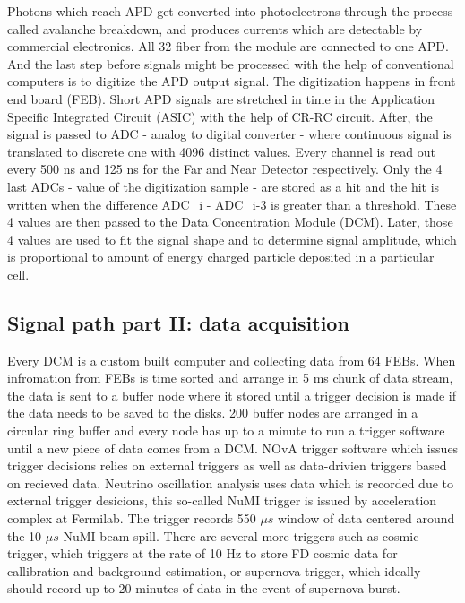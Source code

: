 Photons which reach APD get converted into photoelectrons through the process called avalanche 
breakdown, and produces currents which are detectable by commercial electronics. All 32 fiber from
the module are connected to one APD. And the last step before signals might be processed with the 
help of conventional computers is to digitize the APD output signal. The digitization happens in
front end board (FEB). Short APD signals are stretched in time in the Application Specific 
Integrated Circuit (ASIC) with the help of CR-RC circuit. After, the signal is passed to ADC - 
analog to digital converter - where continuous signal is translated to discrete one with 4096 
distinct values. Every channel is read out every 500 ns and 125 ns for the Far and Near Detector 
respectively. Only the 4 last ADCs - value of the digitization sample - are stored as a hit and 
the hit is written when the difference
\be
ADC_i - ADC_{i-3}
\ee
is greater than a threshold. These 4 values are then passed to the Data Concentration Module (DCM). 
Later, those 4 values are used to fit the signal shape and to determine signal amplitude, which 
is proportional to amount of energy charged particle deposited in a particular cell.

\subsection{Signal path part II: data acquisition}
Every DCM is a custom built computer and collecting data from 64 FEBs. When infromation from FEBs 
is time sorted and arrange in 5 ms chunk of data stream, the data is sent to a buffer node where it 
stored until a trigger decision is made if the data needs to be saved to the disks. 200 buffer nodes 
are arranged in a circular ring buffer and every node has up to a minute to run a trigger software 
until a new piece of data comes from a DCM. NOvA trigger software which issues trigger decisions relies
on external triggers as well as data-drivien triggers based on recieved data. Neutrino oscillation
analysis uses data which is recorded due to external trigger desicions, this so-called NuMI trigger 
is issued by acceleration complex at Fermilab. The trigger records 550 $\mu s$ window of data centered 
around the 10 $\mu s$ NuMI beam spill. There are several more triggers such as cosmic trigger, which 
triggers at the rate of 10 Hz to store FD cosmic data for callibration and background estimation, or 
supernova trigger, which ideally should record up to 20 minutes of data in the event of supernova burst.

